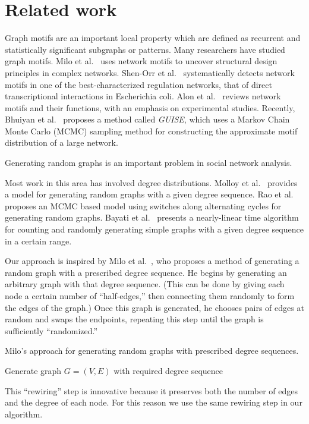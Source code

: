 \section{Related work}
\label{sec:related}

 Graph motifs are an important local property which are defined as recurrent and statistically significant subgraphs or patterns. Many researchers have studied graph motifs. 
Milo et al.~\cite{milo2002network} uses network motifs to uncover structural design principles in complex networks.
Shen-Orr et al.~\cite{shen2002network} systematically detects network motifs in one of the best-characterized regulation networks, that of direct transcriptional interactions in Escherichia coli. 
Alon et al.~\cite{alon2007network} reviews network motifs and their functions, with an emphasis on experimental studies.
Recently, Bhuiyan et al.~\cite{bhuiyan2012guise} proposes a method called \textit{GUISE}, which uses a Markov Chain Monte Carlo (MCMC) sampling method for constructing the approximate motif distribution of a large network.

 Generating random graphs is an important problem in social network analysis. 

Most work in this area has involved degree distributions. 
Molloy et al.~\cite{molloy1995critical} provides a model for generating random graphs with a given degree sequence. 
Rao et al.~\cite{rao1996markov} proposes an MCMC based model using switches along alternating cycles for generating random graphs.
Bayati et al.~\cite{bayati2010sequential} presents a nearly-linear time algorithm for counting and randomly generating simple graphs with a given degree sequence in a certain range. 

Our approach is inspired by Milo et al.~\cite{milo04random}, who proposes a method of generating a random graph with a prescribed degree sequence.  He begins by generating an arbitrary graph with that degree sequence.  (This can be done by giving each node a certain number of ``half-edges,'' then connecting them randomly to form the edges of the graph.)  Once this graph is generated, he chooses pairs of edges at random and swaps the endpoints, repeating this step until the graph is sufficiently ``randomized.''

\begin{algorithm}
\caption{Milo's approach for generating random graphs with prescribed degree sequences.}
\label{algorithm:milo}
\begin{algorithmic}
Generate graph $G = (V, E)$ with required degree sequence\\
\end{algorithmic}
\end{algorithm}

This ``rewiring'' step is innovative because it preserves both the number of edges and the degree of each node.  For this reason we use the same rewiring step in our algorithm.